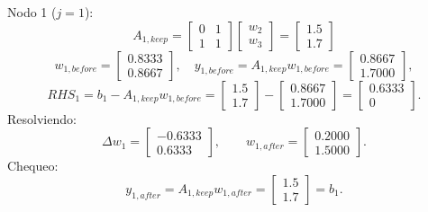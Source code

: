 \documentclass[11pt,a4paper]{article}
\begin{document}
Nodo 1 ($j=1$):
\[
A_{1,keep}=
\begin{bmatrix}
0&1\\
1&1
\end{bmatrix}
\begin{bmatrix}
w_2\\w_3
\end{bmatrix}
=
\begin{bmatrix}
1.5\\1.7
\end{bmatrix}
\]
\[
w_{1,before}=
\begin{bmatrix}
0.8333\\0.8667
\end{bmatrix},
\quad
y_{1,before}=A_{1,keep}w_{1,before}=
\begin{bmatrix}
0.8667\\1.7000
\end{bmatrix},
\]
\[
RHS_1=b_1-A_{1,keep}w_{1,before}
=
\begin{bmatrix}
1.5\\1.7
\end{bmatrix}
-
\begin{bmatrix}
0.8667\\1.7000
\end{bmatrix}
=
\begin{bmatrix}
0.6333\\0
\end{bmatrix}.
\]
Resolviendo:
\[
\Delta w_1=
\begin{bmatrix}
-0.6333\\0.6333
\end{bmatrix},
\qquad
w_{1,after}=
\begin{bmatrix}
0.2000\\1.5000
\end{bmatrix}.
\]
Chequeo:
\[
y_{1,after}=A_{1,keep}w_{1,after}
=
\begin{bmatrix}
1.5\\1.7
\end{bmatrix}
=b_1.
\]
\end{document}
